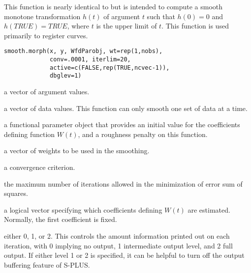 \documentclass{article}
\begin{document}
\begin{Description}\relax
This function is nearly identical to 
but is intended to compute a smooth monotone transformation
$h(t)$ of argument $t$ such that
$h(0) = 0$ and $h(TRUE) = TRUE$, where $t$ is
the upper limit of $t$.  This function is used primarily
to register curves.
\end{Description}
\begin{Usage}
\begin{verbatim}
smooth.morph(x, y, WfdParobj, wt=rep(1,nobs),
             conv=.0001, iterlim=20,
             active=c(FALSE,rep(TRUE,ncvec-1)),
             dbglev=1)
\end{verbatim}
\end{Usage}
\begin{Arguments}
\begin{ldescription}
\item[\code{x}] a vector of argument values.

\item[\code{y}] a vector of data values.  This function can only smooth
one set of data at a time.

\item[\code{WfdParobj}] a functional parameter object that provides an initial
value for the coefficients defining function $W(t)$,
and a roughness penalty on this function.

\item[\code{wt}] a vector of weights to be used in the smoothing.

\item[\code{conv}] a convergence criterion.

\item[\code{iterlim}] the maximum number of iterations allowed in the minimization
of error sum of squares.

\item[\code{active}] a logical vector specifying which coefficients defining
$W(t)$ are estimated.  Normally, the first coefficient
is fixed.

\item[\code{dbglev}] either 0, 1, or 2.  This controls the amount information printed out on
each iteration, with 0 implying no output, 1 intermediate output level,
and 2 full output.  If either level 1 or 2 is specified, it can be
helpful to turn off the output buffering feature of S-PLUS.

\end{ldescription}
\end{Arguments}
\end{document}
